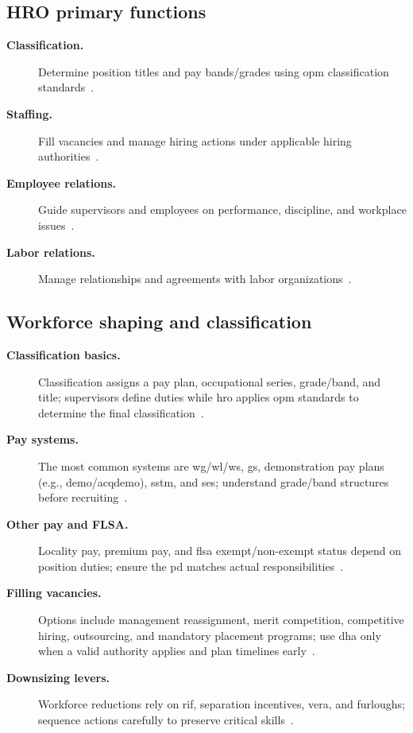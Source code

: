 \documentclass[../main.tex]{subfiles}
\begin{document}
\subsection{HRO primary functions}
\begin{description}
  \item[\textbf{Classification.}] Determine position titles and pay bands/grades using \ac{opm}
  classification standards~\autocite{edo-6-1-1-civpers-overview-2025,opm-classifying-gs-positions}.
  \item[\textbf{Staffing.}] Fill vacancies and manage hiring actions under applicable hiring authorities~\autocite{edo-6-1-1-civpers-overview-2025,opm-direct-hire-authority}.
  \item[\textbf{Employee relations.}] Guide supervisors and employees on performance, discipline, and
  workplace issues~\autocite{edo-6-1-1-civpers-overview-2025}.
  \item[\textbf{Labor relations.}] Manage relationships and agreements with labor organizations~\autocite{edo-6-1-1-civpers-overview-2025}.
\end{description}

\subsection{Workforce shaping and classification}
\begin{description}
  \item[\textbf{Classification basics.}] Classification assigns a pay plan, occupational series, grade/band,
  and title; supervisors define duties while \ac{hro} applies \ac{opm} standards to determine the final
  classification~\autocite{edo-6-1-2-workforce-shaping-2025,opm-classifying-gs-positions}.
  \item[\textbf{Pay systems.}] The most common systems are \ac{wg}/\ac{wl}/\ac{ws}, \ac{gs}, demonstration pay plans (e.g.,
  \ac{demo}/\ac{acqdemo}), \ac{sstm}, and \ac{ses}; understand grade/band structures before recruiting~\autocite{edo-6-1-2-workforce-shaping-2025,ecfr-5cfr-532-203}.
  \item[\textbf{Other pay and FLSA.}] Locality pay, premium pay, and \ac{flsa} exempt/non-exempt status
  depend on position duties; ensure the \ac{pd} matches actual responsibilities~\autocite{edo-6-1-2-workforce-shaping-2025,opm-flsa-overtime}.
  \item[\textbf{Filling vacancies.}] Options include management reassignment, merit competition,
  competitive hiring, outsourcing, and mandatory placement programs; use \ac{dha} only when a valid authority applies and
  plan timelines early~\autocite{edo-6-1-2-workforce-shaping-2025,opm-direct-hire-authority}.
  \item[\textbf{Downsizing levers.}] Workforce reductions rely on \ac{rif}, separation incentives, \ac{vera}, and furloughs;
  sequence actions carefully to preserve critical skills~\autocite{edo-6-1-2-workforce-shaping-2025}.
\end{description}
\end{document}
